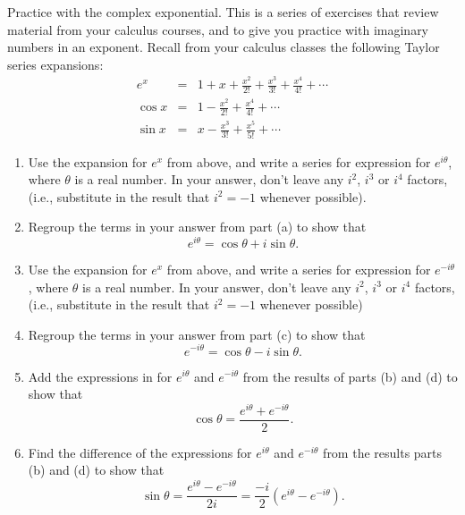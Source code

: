 \begin{aproblem}{Practice with the complex exponential.}  
  This is a series of exercises that review material from your
  calculus courses, and to give you practice with imaginary numbers in
  an exponent.  Recall from your calculus classes the following Taylor
  series expansions:
  \label{prob:ComplexPractice}
  \begin{eqnarray}
    e^x &=&  1+ x +\frac{x^2}{2!}+\frac{x^3}{3!}+ \frac{x^4}{4!} + \cdots
    \nonumber \\
    \cos x &=& 1 - \frac{x^2}{2!} + \frac{x^4}{4!} + \cdots 
    \nonumber \\
    \sin x &=&  x- \frac{x^3}{3!} + \frac{x^5}{5!} + \cdots
    \nonumber 
  \end{eqnarray}
  
  \begin{enumerate}
  \item Use the expansion for $e^x$ from above, and write a series for
    expression for $e^{i\theta}$, where $\theta$ is a real number.  In
    your answer, don't leave any $i^2$, $i^3$ or $i^4$ factors, (i.e.,
    substitute in the result that $i^2=-1$ whenever possible).

  \item Regroup the terms in your answer from part (a) to show that
    \[  e^{i\theta}=\cos\theta +i\sin\theta.  \]

  \item Use the expansion for $e^x$ from above, and write a series for
    expression for $e^{-i\theta}$, where $\theta$ is a real number.
    In your answer, don't leave any $i^2$, $i^3$ or $i^4$ factors,
    (i.e., substitute in the result that $i^2=-1$ whenever possible)

  \item Regroup the terms in your answer from part (c) to show that
    \[  e^{-i\theta}=\cos\theta - i\sin\theta.  \]

  \item Add the expressions in for $e^{i\theta}$ and $e^{-i\theta}$
    from the results of parts (b) and (d) to show that
    \[ \cos\theta = \frac{e^{i\theta} + e^{-i\theta}}{2}. \]

  \item Find the difference of the expressions for $e^{i\theta}$ and
    $e^{-i\theta}$ from the results parts (b) and (d) to show that
    \[ \sin\theta = \frac{e^{i\theta} - e^{-i\theta}}{2i} = 
    \frac{-i}{2}\left(e^{i\theta} - e^{-i\theta}\right). \]


\end{enumerate}
\end{aproblem}
